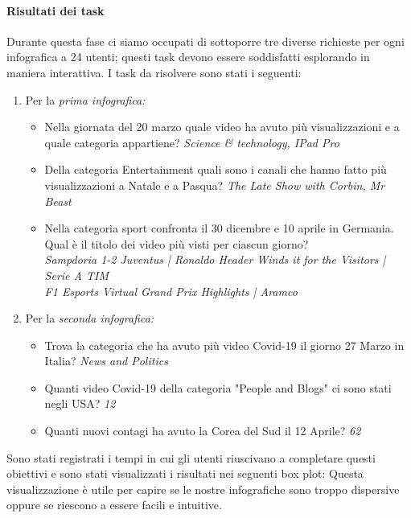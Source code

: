 \documentclass[10pt, a4paper,openany]{article}
\begin{document}
\paragraph{Risultati dei task} Durante questa fase ci siamo occupati di sottoporre tre diverse richieste per ogni infografica a 24 utenti; questi task devono essere soddisfatti esplorando in maniera interattiva. I task da risolvere sono stati i seguenti:
\begin{enumerate}
	\item Per la \textit{prima infografica:}
	\begin{itemize}
		\item Nella giornata del 20 marzo quale video ha avuto più visualizzazioni e a quale categoria appartiene?  \textit{Science \& technology, IPad Pro}
		\item Della categoria Entertainment quali sono i canali che hanno fatto più visualizzazioni a Natale e a Pasqua? \textit{The Late Show with Corbin, Mr Beast}
		\item Nella categoria sport confronta il 30 dicembre e 10 aprile in Germania. Qual è il titolo dei video più visti per ciascun giorno?\\
		\textit{Sampdoria 1-2 Juventus | Ronaldo Header Winds it for the Visitors | Serie A TIM \\ F1 Esports Virtual Grand Prix Highlights | Aramco}
	\end{itemize}
	\item Per la \textit{seconda infografica:}
\begin{itemize}
	\item Trova la categoria che ha avuto più video Covid-19 il giorno 27 Marzo in Italia? \textit{News and Politics}
	\item Quanti video Covid-19 della categoria "People and Blogs" ci sono stati negli USA? \textit{12}
	\item Quanti nuovi contagi ha avuto la Corea del Sud il 12 Aprile? \textit{62}
\end{itemize}
\end{enumerate}

Sono stati registrati i tempi in cui gli utenti riuscivano a completare questi obiettivi e sono stati visualizzati i risultati nei seguenti box plot:
Questa visualizzazione è utile per capire se le nostre infografiche sono troppo dispersive oppure se riescono a essere facili e intuitive.
\end{document}
